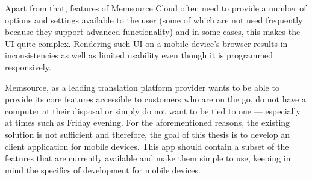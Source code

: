 Apart from that, features of Memsource Cloud often need to provide a number of options and settings available to the user (some of which are not used frequently because they support advanced functionality) and in some cases, this makes the UI quite complex. Rendering such UI on a mobile device's browser results in inconsistencies as well as limited usability even though it is programmed responsively.

Memsource, as a leading translation platform provider wants to be able to provide its core features accessible to customers who are on the go, do not have a computer at their disposal or simply do not want to be tied to one --- especially at times such as Friday evening. For the aforementioned reasons, the existing solution is not sufficient and therefore, the goal of this thesis is to develop an client application for mobile devices. This app should contain a subset of the features that are currently available and make them simple to use, keeping in mind the specifics of development for mobile devices.




